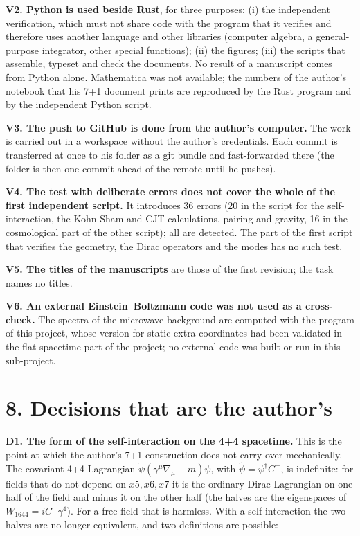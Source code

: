 \documentclass[
  10pt,
]{article}
\begin{document}
\textbf{V2. Python is used beside Rust}, for three purposes: (i) the
independent verification, which must not share code with the program
that it verifies and therefore uses another language and other libraries
(computer algebra, a general-purpose integrator, other special
functions); (ii) the figures; (iii) the scripts that assemble, typeset
and check the documents. No result of a manuscript comes from Python
alone. Mathematica was not available; the numbers of the author's
notebook that his 7+1 document prints are reproduced by the Rust program
and by the independent Python script.

\textbf{V3. The push to GitHub is done from the author's computer.} The
work is carried out in a workspace without the author's credentials.
Each commit is transferred at once to his folder as a git bundle and
fast-forwarded there (the folder is then one commit ahead of the remote
until he pushes).

\textbf{V4. The test with deliberate errors does not cover the whole of
the first independent script.} It introduces 36 errors (20 in the script
for the self-interaction, the Kohn-Sham and CJT calculations, pairing
and gravity, 16 in the cosmological part of the other script); all are
detected. The part of the first script that verifies the geometry, the
Dirac operators and the modes has no such test.

\textbf{V5. The titles of the manuscripts} are those of the first
revision; the task names no titles.

\textbf{V6. An external Einstein--Boltzmann code was not used as a
cross-check.} The spectra of the microwave background are computed with
the program of this project, whose version for static extra coordinates
had been validated in the flat-spacetime part of the project; no
external code was built or run in this sub-project.

\hypertarget{decisions-that-are-the-authors}{%
\section{8. Decisions that are the
author's}\label{decisions-that-are-the-authors}}

\textbf{D1. The form of the self-interaction on the 4+4 spacetime.} This
is the point at which the author's 7+1 construction does not carry over
mechanically. The covariant 4+4 Lagrangian
\(\tilde\psi(\gamma^\mu\nabla_\mu-m)\psi\), with
\(\tilde\psi=\psi^\dagger C^-\), is indefinite: for fields that do not
depend on \(x5,x6,x7\) it is the ordinary Dirac Lagrangian on one half
of the field and minus it on the other half (the halves are the
eigenspaces of \(W_{1644}=iC^-\gamma^4\)). For a free field that is
harmless. With a self-interaction the two halves are no longer
equivalent, and two definitions are possible:
\end{document}
